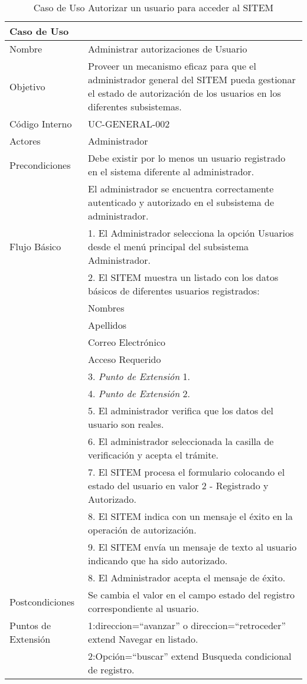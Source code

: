 \begin{table}
\begin{center}
\begin{tabular}{|l|p{10cm}|}
\hline
\textbf{Caso de Uso}&\\
\hline
Nombre & Administrar autorizaciones de Usuario\\
\hline
Objetivo & Proveer un mecanismo eficaz para que el administrador general del SITEM pueda gestionar el estado de autorización de los usuarios en los diferentes subsistemas.\\
\hline
Código Interno & UC-GENERAL-002 \\
\hline
Actores & Administrador\\
\hline
Precondiciones & Debe existir por lo menos un usuario registrado en el sistema diferente al administrador.\\
& El administrador se encuentra correctamente autenticado y autorizado en el subsistema de administrador.\\
\hline
Flujo Básico & 1. El Administrador selecciona la opción Usuarios desde el menú principal del subsistema Administrador.\\
& 2. El SITEM muestra un listado con los datos básicos de diferentes usuarios registrados:\\
& Nombres\\
& Apellidos\\
& Correo Electrónico\\
& Acceso Requerido\\
& 3. \textit{Punto de Extensión} 1.\\
& 4. \textit{Punto de Extensión} 2.\\
& 5. El administrador verifica que los datos del usuario son reales.\\
& 6. El administrador seleccionada la casilla de verificación y acepta el trámite.\\
& 7. El SITEM procesa el formulario colocando el estado del usuario en valor 2 - Registrado y Autorizado.\\
& 8. El SITEM indica con un mensaje el éxito en la operación de autorización.\\
& 9. El SITEM envía un mensaje de texto al usuario indicando que ha sido autorizado.\\
& 8. El Administrador acepta el mensaje de éxito.\\
\hline
Postcondiciones & Se cambia el valor en el campo estado del registro correspondiente al usuario.\\
\hline
Puntos de Extensión & 1:direccion=“avanzar” o direccion=“retroceder” extend Navegar en listado. \\
& 2:Opción=“buscar” extend Busqueda condicional de registro. \\
\hline
\end{tabular}
\caption{Caso de Uso Autorizar un usuario para acceder al SITEM}
\label{casouso2} 
\end{center}
\end{table}

